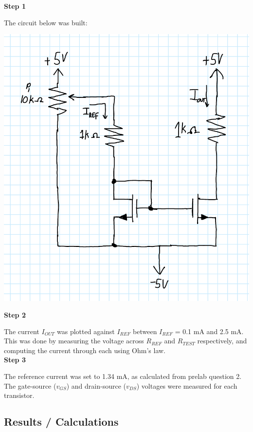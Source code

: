 \documentclass[notitlepage, 12pt]{report}  %
\begin{document}
\textbf{Step 1}

The circuit below was built:

\begin{center}
    \includegraphics[scale=0.3]{currentmirror.png}
\end{center}

\textbf{Step 2}

The current $I_{OUT}$ was plotted against $I_{REF}$ between $I_{REF}$ = 0.1 mA and 2.5 mA. This was done by 
measuring the voltage across $R_{REF}$ and $R_{TEST}$ respectively, and computing the current through each 
using Ohm's law.\\

\textbf{Step 3}

The reference current was set to 1.34 mA, as calculated from prelab question 2. The gate-source ($v_{GS}$) and drain-source ($v_{DS}$) voltages were 
measured for each transistor. \\

\newpage

\subsection*{Results / Calculations}
\end{document}
